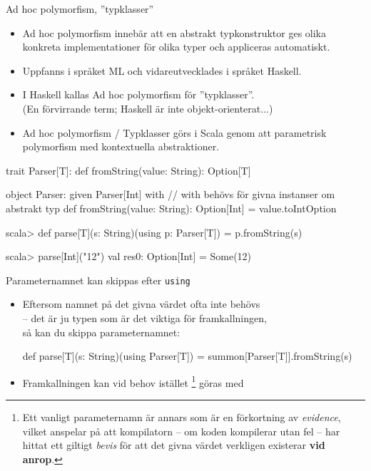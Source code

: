 \begin{Slide}{Ad hoc polymorfism, ''typklasser''}\SlideFontSmall
\begin{itemize}\SlideFontSmall
\item Ad hoc polymorfism innebär att en abstrakt typkonstruktor ges olika konkreta implementationer för olika typer och appliceras automatiskt. 
\item Uppfanns i språket ML och vidareutvecklades i språket Haskell.
\item I Haskell kallas Ad hoc polymorfism för ''typklasser''. \\(En förvirrande term; Haskell är inte objekt-orienterat...)
\item Ad hoc polymorfism / Typklasser görs i Scala genom att  parametrisk polymorfism med kontextuella abstraktioner.
\end{itemize}
\begin{Code}
trait Parser[T]:
  def fromString(value: String): Option[T]

object Parser:
  given Parser[Int] with  // with behövs för givna instanser om abstrakt typ
    def fromString(value: String): Option[Int] = value.toIntOption   
\end{Code}
\begin{REPL}
scala> def parse[T](s: String)(using p: Parser[T]) = p.fromString(s)

scala> parse[Int]("12")
val res0: Option[Int] = Some(12)
\end{REPL}
\end{Slide}

\begin{Slide}{Parameternamnet kan skippas efter \texttt{using}}
\begin{itemize}
\item Eftersom namnet på det givna värdet ofta inte behövs\\ -- det är ju typen som är det viktiga för framkallningen, \\ så kan du skippa parameternamnet:%

\begin{Code}[basicstyle=\ttfamily\SlideFontSize{10}{14}\selectfont]
def parse[T](s: String)(using Parser[T]) = 
  summon[Parser[T]].fromString(s)
\end{Code}
\item Framkallningen kan vid behov istället%
\footnote{Ett vanligt parameternamn är annars  som är en förkortning av \emph{evidence}, vilket anspelar på att kompilatorn -- om koden kompilerar utan fel -- har hittat ett giltigt \emph{bevis} för att det givna värdet verkligen existerar \textbf{vid anrop}.}
 göras med %

\end{itemize}
\end{Slide}



